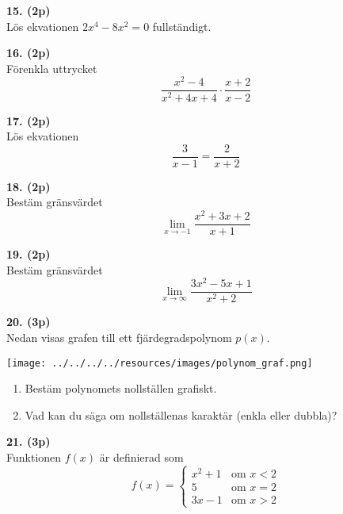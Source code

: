 \documentclass[12pt]{article}
\begin{document}
\vspace{0.5cm}

\noindent
\textbf{15. (2p)} \\
Lös ekvationen $2x^4 - 8x^2 = 0$ fullständigt.

\vspace{0.5cm}

\noindent
\textbf{16. (2p)} \\
Förenkla uttrycket
\[
 \frac{x^2 - 4}{x^2 + 4x + 4} \cdot \frac{x + 2}{x - 2}
\]

\vspace{0.5cm}

\noindent
\textbf{17. (2p)} \\
Lös ekvationen
\[
 \frac{3}{x - 1} = \frac{2}{x + 2}
\]

\vspace{0.5cm}

\noindent
\textbf{18. (2p)} \\
Bestäm gränsvärdet
\[
 \lim_{x \to -1} \frac{x^2 + 3x + 2}{x + 1}
\]

\vspace{0.5cm}

\noindent
\textbf{19. (2p)} \\
Bestäm gränsvärdet
\[
 \lim_{x \to \infty} \frac{3x^2 - 5x + 1}{x^2 + 2}
\]

\vspace{0.5cm}

\noindent
\textbf{20. (3p)} \\
Nedan visas grafen till ett fjärdegradspolynom $p(x)$.

\begin{center}
 \texttt{[image: ../../../../resources/images/polynom\_graf.png]}
\end{center}

\begin{enumerate}[label=\alph*)]
    \item Bestäm polynomets nollställen grafiskt.
    \item Vad kan du säga om nollställenas karaktär (enkla eller dubbla)?
\end{enumerate}

\vspace{0.5cm}

\noindent
\textbf{21. (3p)} \\
Funktionen $f(x)$ är definierad som
\[
 f(x) = \begin{cases}
 x^2 + 1 & \text{om } x < 2 \\
 5 & \text{om } x = 2 \\
 3x - 1 & \text{om } x > 2
 \end{cases}
\]
\end{document}
